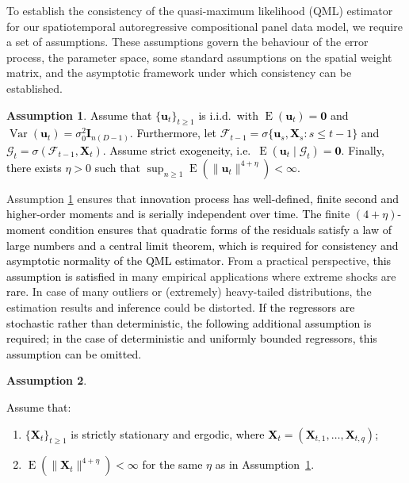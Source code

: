 \documentclass[12pt]{article}
\theoremstyle{plain}
\theoremstyle{definition}
\newcommand{\xvec}{\boldsymbol}
\newcommand{\xmat}{\mathbf}
\DeclareMathOperator{\E}{E}
\DeclareMathOperator{\Var}{Var}
\newtheorem{assumption}{Assumption}
\begin{document}
To establish the consistency of the quasi-maximum likelihood (QML) estimator for our spatiotemporal autoregressive compositional panel data model, we require a set of assumptions. These assumptions govern the behaviour of the error process, the parameter space, some standard assumptions on the spatial weight matrix, and the asymptotic framework under which consistency can be established.

\begin{assumption}\label{ass:err_exo_cons}
\textcolor{black}{Assume that $\{\xvec{u}_t\}_{t\ge1}$ is i.i.d.\ with $\E(\xvec{u}_t)=\xvec{0}$ and $\Var(\xvec{u}_t)=\sigma_0^2 \xmat{I}_{n(D-1)}$. Furthermore, let $\mathcal{F}_{t-1}=\sigma\{\xvec{u}_s,\xmat{X}_s: s\le t-1\}$ and
$\mathcal{G}_t=\sigma(\mathcal{F}_{t-1},\xmat{X}_t)$. Assume strict exogeneity, i.e.\
$\E(\xvec{u}_t\mid \mathcal{G}_t)=\xvec{0}$.
Finally, there exists $\eta > 0$ such that $\sup_{n \geq 1}\E\!\left(\|\xvec{u}_t\|^{4+\eta}\right) < \infty.$}
\end{assumption}

Assumption \ref{ass:err_exo_cons} ensures that \textcolor{black}{innovation process has well-defined, finite second and higher-order moments and is serially independent over time. The finite $(4+\eta)$-moment condition ensures that quadratic forms of the residuals satisfy a law of large numbers and a central limit theorem, which is required for consistency and asymptotic normality of the QML estimator.} From a practical perspective, \textcolor{black}{this assumption is satisfied} in many empirical applications where extreme shocks are \textcolor{black}{rare}. In case of many outliers or (extremely) heavy-tailed distributions, the estimation results \textcolor{black}{and inference} could be distorted. \textcolor{black}{If the regressors are stochastic rather than deterministic, the following additional assumption is required; in the case of deterministic and uniformly bounded regressors, this assumption can be omitted.}

\begin{assumption}\label{ass:X_stoch_cons}
\textcolor{black}{Assume that:
\begin{enumerate}
\item[(i)] $\{\xmat{X}_t\}_{t\ge1}$ is strictly stationary and ergodic, where
$\xmat{X}_t=(\xmat{X}_{t,1},\ldots,\xmat{X}_{t,q})$;
\item[(ii)] $\E(\|\xmat{X}_t\|^{4+\eta})<\infty$ for the same $\eta$ as in
Assumption~\ref{ass:err_exo_cons}.
\end{enumerate}
}
\end{assumption}
\end{document}
